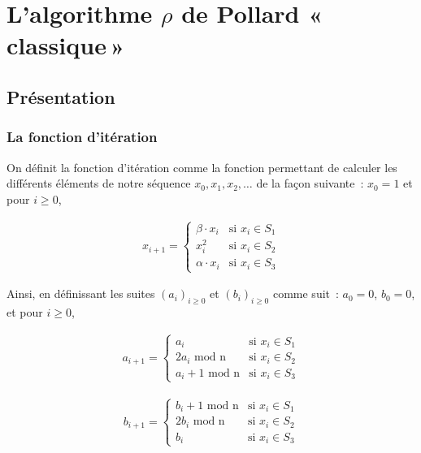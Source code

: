 \chapter{L'algorithme \texorpdfstring{$\rho$}{Rho} de Pollard «\texorpdfstring{\,}{\ }classique\texorpdfstring{\,}{\ }»}
    \section{Présentation}

        \subsection{La fonction d'itération}
        On définit la fonction d'itération comme la fonction permettant de calculer les différents éléments de notre séquence $x_0, x_1, x_2, \ldots$ de la façon suivante~: $x_0 = 1$ et pour $i \geq 0$,

        \begin{align*}
          x_{i+1} =
          \begin{cases}
            \beta \cdot x_i & \text{si } x_i \in S_1 \\
            x_i^2 & \text{si } x_i \in S_2 \\
            \alpha \cdot x_i & \text{si } x_i \in S_3
          \end{cases}
        \end{align*}

        Ainsi, en définissant les suites $(a_i)_{i \geq 0}$ et $(b_i)_{i \geq 0}$ comme suit~: $a_0 = 0$, $b_0 = 0$, et pour $i \geq 0$,

        \begin{align*}
          a_{i+1} =
          \begin{cases}
            a_i                   & \text{si } x_i \in S_1 \\
            2a_i \text{\ mod n}    & \text{si } x_i \in S_2 \\
            a_i + 1 \text{\ mod n} & \text{si } x_i \in S_3
          \end{cases}
        \end{align*}

        \begin{align*}
          b_{i+1} =
          \begin{cases}
            b_i + 1 \text{\ mod n} & \text{si } x_i \in S_1 \\
            2b_i \text{\ mod n}    & \text{si } x_i \in S_2 \\
            b_i                   & \text{si } x_i \in S_3
          \end{cases}
        \end{align*}

